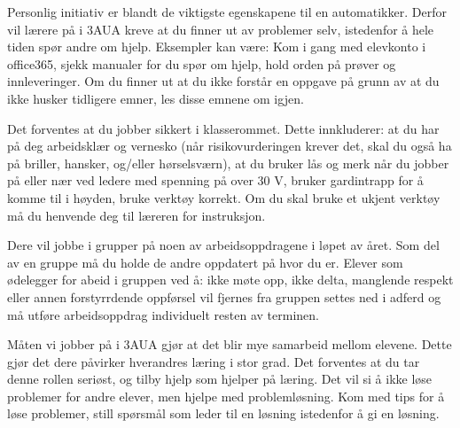 \vskip 10pt



\noindent
{} Personlig initiativ er blandt de viktigste egenskapene til en automatikker. Derfor vil lærere på i 3AUA kreve at du finner ut av problemer selv, istedenfor å hele tiden spør andre om hjelp. Eksempler kan være: Kom i gang med elevkonto i office365, sjekk manualer for du spør om hjelp, hold orden på prøver og innleveringer. Om du finner ut at du ikke forstår en oppgave på grunn av at du ikke husker tidligere emner, les disse emnene om igjen. 
\vskip 10pt

\noindent
{} Det forventes at du jobber sikkert i klasserommet. Dette innkluderer: at du har på deg arbeidsklær og vernesko (når risikovurderingen krever det,  skal du også ha på briller, hansker, og/eller hørselsværn), at du bruker lås og merk når du jobber på eller nær ved ledere med spenning på over 30 V, bruker gardintrapp for å komme til i høyden, bruke verktøy korrekt. Om du skal bruke et ukjent verktøy må du henvende deg til læreren for instruksjon. 
\vskip 10pt

\noindent
{} Dere vil jobbe i grupper på noen av arbeidsoppdragene i løpet av året. Som del av en gruppe må du holde de andre oppdatert på hvor du er. Elever som ødelegger for abeid i gruppen  ved å: ikke møte opp, ikke delta, manglende respekt eller annen forstyrrdende oppførsel vil fjernes fra gruppen settes ned i adferd og må utføre arbeidsoppdrag individuelt resten av terminen. 
\vskip 10pt

\noindent
{} Måten vi jobber på i 3AUA gjør at det blir mye samarbeid mellom elevene. Dette gjør det dere påvirker hverandres læring i stor grad. Det forventes at du tar denne rollen seriøst, og tilby hjelp som hjelper på læring. Det vil si å ikke løse problemer for andre elever, men hjelpe med problemløsning. Kom med tips for å løse problemer, still spørsmål som leder til en løsning istedenfor å gi en løsning. 
\vskip 10pt


